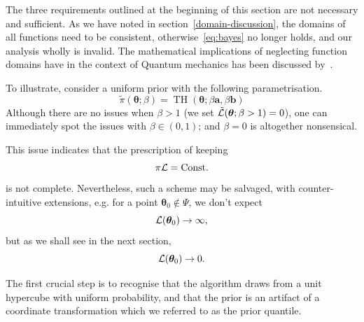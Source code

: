 \documentclass[usenatbib]{mnras}
\DeclareMathOperator{\TopHat}{TH}
\begin{document}
The three requirements outlined at the beginning of this section are
not necessary and sufficient. As we have noted in
section~\vref{domain-discussion}, the domains of all functions need to
be consistent, otherwise~\vref{eq:bayes} no longer holds, and our
analysis wholly is invalid. The mathematical implications of
neglecting function domains have in the context of Quantum mechanics
has been discussed by~\cite{Gieres_2000}.

To illustrate, consider a uniform prior with the following
parametrisation.
\begin{equation*}
  \tilde{\pi}(\bm{\theta}; \beta) = \TopHat(\bm{\theta}; \beta \bm{a}, \beta \bm{b})
\end{equation*}
Although there are no issues when \(\beta>1\) (we set
\({\cal\tilde{L}}(\bm{\theta}; \beta>1)=0\)), one can immediately
spot the issues with \(\beta \in (0,1)\); and \(\beta=0\) is
altogether nonsensical.

This issue indicates that the prescription of keeping \[\pi {\cal
	L} = \text{Const.}\] is not complete. Nevertheless, such a scheme
may be salvaged, with counter-intuitive extensions, e.g. for a
point \(\bm{\theta}_{0} \notin \Psi\), we don't expect
\[{\cal L}(\bm{\theta}_{0}) \rightarrow \infty,\] but as we shall see in
the next section, \[{\cal L}(\bm{\theta}_{0}) \rightarrow 0.\]

The first crucial step is to recognise that the algorithm draws
from a unit hypercube with uniform probability, and that the prior
is an artifact of a coordinate transformation which we referred to
as the prior quantile.
\end{document}
